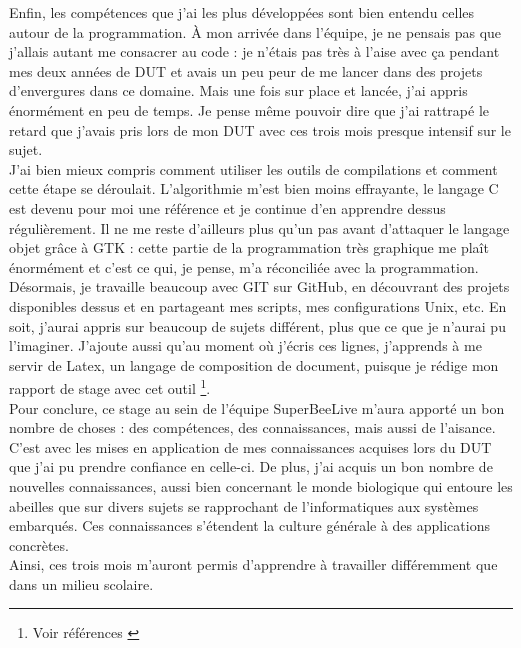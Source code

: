 \documentclass[11pt,french,a4paper]{report}
\begin{document}
Enfin, les compétences que j'ai les plus développées sont bien entendu celles autour de la programmation. 
À mon arrivée dans l'équipe, je ne pensais pas que j'allais autant me consacrer au code : je n'étais pas très à l'aise avec ça 
pendant mes deux années de DUT et avais un peu peur de me lancer dans des projets d'envergures dans ce domaine. 
Mais une fois sur place et lancée, j'ai appris énormément en peu de temps. Je pense même pouvoir dire que j'ai rattrapé le retard 
que j'avais pris lors de mon DUT avec ces trois mois presque intensif sur le sujet. \\
J'ai bien mieux compris comment utiliser les outils de compilations et comment cette étape se déroulait. L'algorithmie m'est bien moins
effrayante, le langage C est devenu pour moi une référence et je continue d'en apprendre dessus régulièrement. 
Il ne me reste d'ailleurs plus qu'un pas avant d'attaquer le langage objet grâce à GTK : cette partie de la programmation très graphique
me plaît énormément et c'est ce qui, je pense, m'a réconciliée avec la programmation. \\
Désormais, je travaille beaucoup avec GIT sur GitHub, en découvrant des projets disponibles dessus et en partageant mes scripts,
mes configurations Unix, etc. 
En soit, j'aurai appris sur beaucoup de sujets différent, plus que ce que je n'aurai pu l'imaginer.
J'ajoute aussi qu'au moment où j'écris ces lignes, j'apprends à me servir de Latex, un langage de composition de document, 
puisque je rédige mon rapport de stage avec cet outil \footnote{Voir références \cite{ref4} \cite{ref9}}.\\

Pour conclure, ce stage au sein de l'équipe SuperBeeLive m'aura apporté un bon nombre de choses : des compétences, des connaissances, mais 
aussi de l'aisance. C'est avec les mises en application de mes connaissances acquises lors du DUT que j'ai pu prendre confiance en celle-ci.
De plus, j'ai acquis un bon nombre de nouvelles connaissances, aussi bien concernant le monde biologique qui entoure les abeilles que sur 
divers sujets se rapprochant de l'informatiques aux systèmes embarqués. Ces connaissances s'étendent la culture générale à des applications 
concrètes.\\
Ainsi, ces trois mois m'auront permis d'apprendre à travailler différemment que dans un milieu scolaire. 
\end{document}
